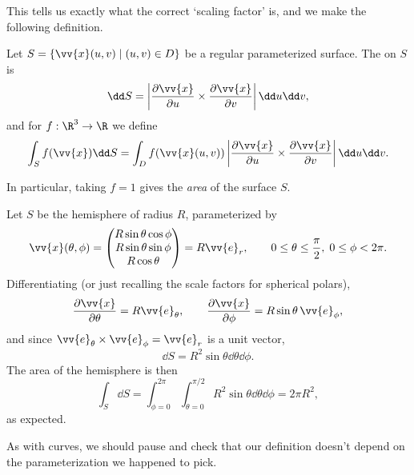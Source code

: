 This tells us exactly what the correct `scaling factor' is, and we make the following definition.

\begin{definition}
	Let $S = \{\vv{x}(u, v) \mid (u, v) \in D\}$ be a regular parameterized surface. The  on $S$ is
	$$
	\dd S = \left|\frac{\partial \vv{x}}{\partial u} \times \frac{\partial \vv{x}}{\partial v}\right| \dd u \dd v,
	$$
	and for $f : \R^3 \rightarrow \R$ we define
	$$
	\int_S f(\vv{x}) \dd S = \int_D f(\vv{x}(u, v)) \left|\frac{\partial \vv{x}}{\partial u} \times \frac{\partial \vv{x}}{\partial v}\right| \dd u \dd v.
	$$
\end{definition}

In particular, taking $f = 1$ gives the \emph{area} of the surface $S$.

\begin{example}
	Let $S$ be the hemisphere of radius $R$, parameterized by
	$$
	\vv{x}(\theta, \phi) = \begin{pmatrix}
		R \sin \theta \cos \phi \\
		R \sin \theta \sin \phi \\
		R \cos \theta
	\end{pmatrix} = R \vv{e}_r, \quad \quad 0 \leq \theta \leq \frac{\pi}{2}, \; 0 \leq \phi < 2\pi.
	$$
	Differentiating (or just recalling the scale factors for spherical polars),
	$$
	\frac{\partial \vv{x}}{\partial \theta} = R \vv{e}_\theta, \quad \quad \frac{\partial \vv{x}}{\partial \phi} = R \sin \theta \, \vv{e}_\phi,
	$$
	and since $\vv{e}_\theta \times \vv{e}_\phi = \vv{e}_r$ is a unit vector,
	$$
	\dd S = R^2 \sin \theta \dd \theta \dd \phi.
	$$
	The area of the hemisphere is then
	$$
	\int_S \dd S = \int_{\phi = 0}^{2 \pi} \int_{\theta = 0}^{\pi/2} R^2 \sin \theta \dd \theta \dd \phi = 2 \pi R^2,
	$$
	as expected.
\end{example}

As with curves, we should pause and check that our definition doesn't depend on the parameterization we happened to pick.

